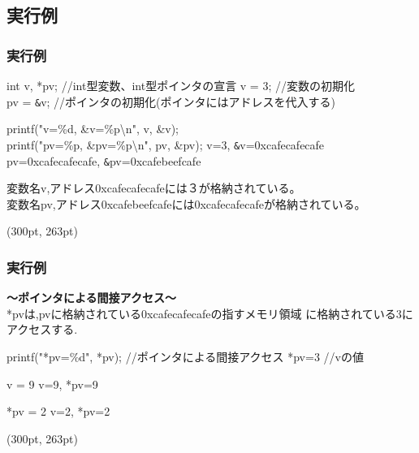 \documentclass[dvipdfmx]{beamer}
\begin{document}
\subsection{実行例}
\begin{frame}[c, fragile]
    \frametitle{実行例}
    \begin{block}{int v, *pv; //int型変数、int型ポインタの宣言}
        v = 3; //変数の初期化\\
        pv = \verb|&|v; //ポインタの初期化(ポインタにはアドレスを代入する)
    \end{block}
    \begin{block}{%
            printf("v=\%d, \&v=\%p\textbackslash n", v, \&v);\\
            printf("pv=\%p, \&pv=\%p\textbackslash n", pv, \&pv);
        }
        v=3, \verb|&|v=0xcafecafecafe\\
        pv=0xcafecafecafe, \verb|&|pv=0xcafebeefcafe
    \end{block}
    変数名v,アドレス0xcafecafecafeには３が格納されている。\\
    変数名pv,アドレス0xcafebeefcafeには0xcafecafecafeが格納されている。
    \begin{textblock*}{0.3\linewidth}(300pt, 263pt)
        \space
    \end{textblock*}
\end{frame}

\begin{frame}[t, fragile]
    \frametitle{実行例}
    \textbf{～ポインタによる間接アクセス～}\\
    *pvは,pvに格納されている0xcafecafecafeの指すメモリ領域
    に格納されている3にアクセスする.
    \begin{block}{printf("*pv=\%d", *pv); //ポインタによる間接アクセス}
        *pv=3 //vの値
    \end{block}
    \begin{block}{v = 9}
        v=9, *pv=9
    \end{block}
    \begin{block}{*pv = 2}
        v=2, *pv=2
    \end{block}
    \begin{textblock*}{0.3\linewidth}(300pt, 263pt)
        \space
    \end{textblock*}
\end{frame}
\end{document}

